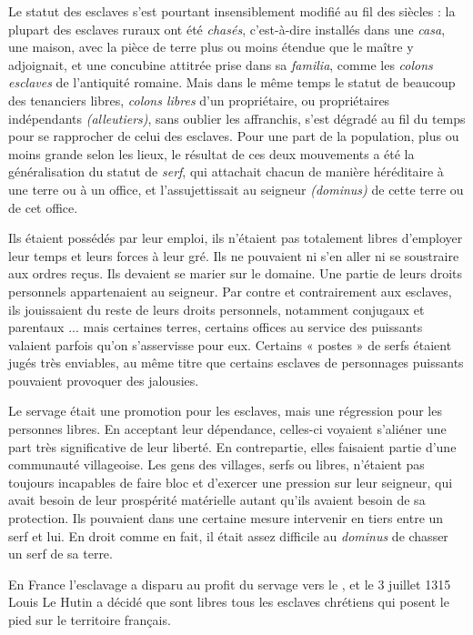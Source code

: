  Le statut des esclaves s'est pourtant insensiblement modifié au fil des siècles : la plupart des esclaves ruraux ont été \emph{chasés}, c'est-à-dire installés dans une \emph{casa}, une maison, avec la pièce de terre plus ou moins étendue que le maître y adjoignait, et une concubine attitrée prise dans sa \emph{familia}, comme les \emph{colons esclaves} de l'antiquité romaine. Mais dans le même temps le statut de beaucoup des tenanciers libres, \emph{colons libres} d'un propriétaire, ou propriétaires indépendants \emph{(alleutiers)}, sans oublier les affranchis, s'est dégradé au fil du temps pour se rapprocher de celui des esclaves. Pour une part de la population, plus ou moins grande selon les lieux, le résultat de ces deux mouvements a été la généralisation du statut de \emph{serf}, qui attachait chacun de manière héréditaire à une terre ou à un office, et l'assujettissait au seigneur \emph{(dominus)} de cette terre ou de cet office. 

 Ils étaient possédés par leur emploi, ils n'étaient pas totalement libres d'employer leur temps et leurs forces à leur gré. Ils ne pouvaient ni s'en aller ni se soustraire aux ordres reçus. Ils devaient se marier sur le domaine. Une partie de leurs droits personnels appartenaient au seigneur. Par contre et contrairement aux esclaves, ils jouissaient du reste de leurs droits personnels, notamment conjugaux et parentaux ... mais certaines terres, certains offices au service des puissants valaient parfois qu'on s'asservisse pour eux. Certains « postes » de serfs étaient jugés très enviables, au même titre que certains esclaves de personnages puissants pouvaient provoquer des jalousies.

 Le servage était une promotion pour les esclaves, mais une régression pour les personnes libres. En acceptant leur dépendance, celles-ci voyaient s'aliéner une part très significative de leur liberté. En contrepartie, elles faisaient partie d'une communauté villageoise. Les gens des villages, serfs ou libres, n'étaient pas toujours incapables de faire bloc et d'exercer une pression sur leur seigneur, qui avait besoin de leur prospérité matérielle autant qu'ils avaient besoin de sa protection. Ils pouvaient dans une certaine mesure intervenir en tiers entre un serf et lui. En droit comme en fait, il était assez difficile au \emph{dominus} de chasser un serf de sa terre. 
 
 En France l'esclavage a disparu au profit du servage vers le , et le 3 juillet 1315 Louis Le Hutin a décidé que sont libres tous les esclaves chrétiens qui posent le pied sur le territoire français. 

